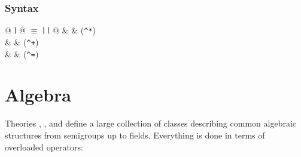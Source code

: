 \begin{isabellebody}
\begin{isamarkuptext}
\subsubsection*{Syntax}

\begin{tabular}{@ {} l @ {\quad$\equiv$\quad} l l @ {}}
 &  & (\verb$^*$)\\
 &  & (\verb$^+$)\\
 &  & (\verb$^=$)
\end{tabular}


\section{Algebra}

Theories , ,  and  define a large collection of classes describing common algebraic
structures from semigroups up to fields. Everything is done in terms of
overloaded operators:


\end{isamarkuptext}
\end{isabellebody}
